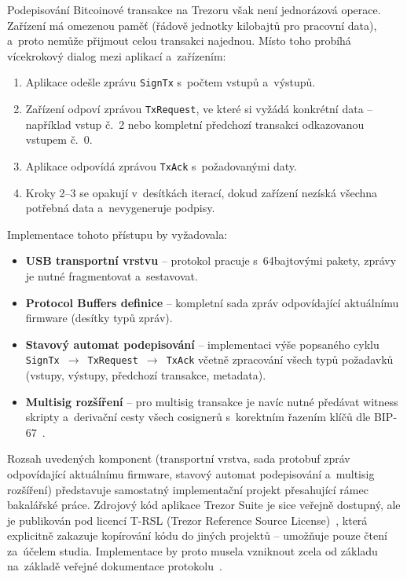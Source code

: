Podepisování Bitcoinové transakce na Trezoru však není jednorázová
operace. Zařízení má omezenou paměť (řádově jednotky kilobajtů pro
pracovní data), a~proto nemůže přijmout celou transakci najednou.
Místo toho probíhá vícekrokový dialog mezi aplikací a~zařízením:

\begin{enumerate}
  \item Aplikace odešle zprávu \texttt{SignTx} s~počtem vstupů a~výstupů.
  \item Zařízení odpoví zprávou \texttt{TxRequest}, ve které si vyžádá
    konkrétní data -- například vstup č.~2 nebo kompletní předchozí transakci
    odkazovanou vstupem č.~0.
  \item Aplikace odpovídá zprávou \texttt{TxAck} s~požadovanými daty.
  \item Kroky 2--3 se opakují v~desítkách iterací, dokud zařízení nezíská
    všechna potřebná data a~nevygeneruje podpisy.
\end{enumerate}

\noindent
Implementace tohoto přístupu by vyžadovala:

\begin{itemize}
  \item \textbf{USB transportní vrstvu} -- protokol pracuje s~64bajtovými
    pakety, zprávy je nutné fragmentovat a~sestavovat.
  \item \textbf{Protocol Buffers definice} -- kompletní sada zpráv
    odpovídající aktuálnímu firmware (desítky typů zpráv).
  \item \textbf{Stavový automat podepisování} -- implementaci výše
    popsaného cyklu \texttt{SignTx}~$\to$~\texttt{TxRequest}~$\to$~\texttt{TxAck}
    včetně zpracování všech typů požadavků (vstupy, výstupy, předchozí
    transakce, metadata).
  \item \textbf{Multisig rozšíření} -- pro multisig transakce je navíc
    nutné předávat witness skripty a~derivační cesty všech cosignerů
    s~korektním řazením klíčů dle BIP-67~\citep{BIP67}.
\end{itemize}

\noindent
Rozsah uvedených komponent (transportní vrstva, sada protobuf zpráv
odpovídající aktuálnímu firmware, stavový automat podepisování
a~multisig rozšíření) představuje samostatný implementační projekt
přesahující rámec bakalářské práce. Zdrojový kód aplikace Trezor Suite
je sice veřejně dostupný, ale je publikován pod licencí T-RSL (Trezor
Reference Source License)~\citep{TRSL}, která explicitně zakazuje
kopírování kódu do jiných projektů -- umožňuje pouze čtení za~účelem
studia. Implementace by proto musela vzniknout zcela od základu
na~základě veřejné dokumentace protokolu~\citep{TrezorFirmwareDocs}.

